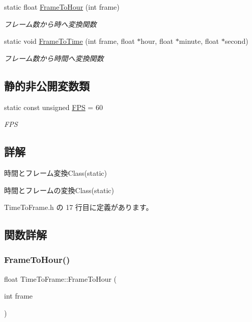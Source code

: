 \begin{DoxyCompactItemize}
static float \mbox{\hyperlink{class_time_to_frame_ab9a81c7b6f84d87f29a602716863a82c}{Frame\+To\+Hour}} (int frame)
\begin{DoxyCompactList}\small\item\em フレーム数から時へ変換関数 \end{DoxyCompactList}\item 
static void \mbox{\hyperlink{class_time_to_frame_a17d56ef5146d0934e48200ca44fcfa79}{Frame\+To\+Time}} (int frame, float $\ast$hour, float $\ast$minute, float $\ast$second)
\begin{DoxyCompactList}\small\item\em フレーム数から時間へ変換関数 \end{DoxyCompactList}\end{DoxyCompactItemize}
\subsection*{静的非公開変数類}
\begin{DoxyCompactItemize}
\item 
static const unsigned \mbox{\hyperlink{class_time_to_frame_a2e16dc9c8965177964d86eb7b67e5254}{F\+PS}} = 60
\begin{DoxyCompactList}\small\item\em F\+PS \end{DoxyCompactList}\end{DoxyCompactItemize}


\subsection{詳解}
時間とフレーム変換\+Class(static) 

時間とフレームの変換\+Class(static) 

 Time\+To\+Frame.\+h の 17 行目に定義があります。



\subsection{関数詳解}
\mbox{\label{class_time_to_frame_ab9a81c7b6f84d87f29a602716863a82c}} 
\subsubsection{\texorpdfstring{Frame\+To\+Hour()}{FrameToHour()}}
{\footnotesize\ttfamily float Time\+To\+Frame\+::\+Frame\+To\+Hour (\begin{DoxyParamCaption}\item[{int}]{frame }\end{DoxyParamCaption})\hspace{0.3cm}{\ttfamily [static]}}



